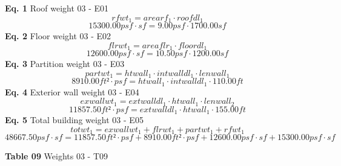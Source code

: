 \documentclass[12pt,notitle,letterpaper]{report}
\begin{document}
\textbf{Eq. 1} Roof weight \hfill 03 - E01
%
\begin{equation*}
rfwt_{1} = arearf_{1} \cdot roofdl_{1}
\end{equation*}%
\begin{equation*}
15300.00 psf·sf = 9.00 psf \cdot 1700.00 sf
\end{equation*}
\textbf{Eq. 2} Floor weight \hfill 03 - E02
%
\begin{equation*}
flrwt_{1} = areaflr_{1} \cdot floordl_{1}
\end{equation*}%
\begin{equation*}
12600.00 psf·sf = 10.50 psf \cdot 1200.00 sf
\end{equation*}
\textbf{Eq. 3} Partition weight \hfill 03 - E03
%
\begin{equation*}
partwt_{1} = htwall_{1} \cdot intwalldl_{1} \cdot lenwall_{1}
\end{equation*}%
\begin{equation*}
8910.00 ft²·psf = htwall_{1} \cdot intwalldl_{1} \cdot 110.00 ft
\end{equation*}
\textbf{Eq. 4} Exterior wall weight \hfill 03 - E04
%
\begin{equation*}
exwallwt_{1} = extwalldl_{1} \cdot htwall_{1} \cdot lenwall_{2}
\end{equation*}%
\begin{equation*}
11857.50 ft²·psf = extwalldl_{1} \cdot htwall_{1} \cdot 155.00 ft
\end{equation*}
\textbf{Eq. 5} Total building weight \hfill 03 - E05
%
\begin{equation*}
totwt_{1} = exwallwt_{1} + flrwt_{1} + partwt_{1} + rfwt_{1}
\end{equation*}%
\begin{equation*}
48667.50 psf·sf = 11857.50 ft²·psf + 8910.00 ft²·psf + 12600.00 psf·sf + 15300.00 psf·sf
\end{equation*}
\vspace{.05in}

\textbf{Table 09} Weights \hfill 03 - T09

  \vspace{.05in}

\nopagebreak
\end{document}
